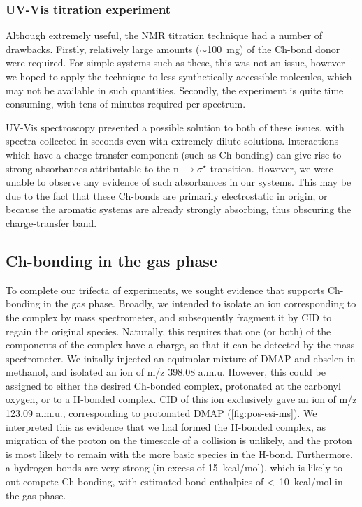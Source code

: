 \subsubsection{UV-Vis titration experiment}
Although extremely useful, the NMR titration technique had a number of drawbacks.
Firstly, relatively large amounts ($\sim$100~mg) of the Ch-bond donor were required.
For simple systems such as these, this was not an issue, however we hoped to apply the technique to less synthetically accessible molecules, which may not be available in such quantities.
Secondly, the experiment is quite time consuming, with tens of minutes required per spectrum.

UV-Vis spectroscopy presented a possible solution to both of these issues, with spectra collected in seconds even with extremely dilute solutions.
Interactions which have a charge-transfer component (such as Ch-bonding) can give rise to strong absorbances attributable to the n $\rightarrow \sigma^{\star}$ transition.\autocite{Blackstock1987}
However, we were unable to observe any evidence of such absorbances in our systems.
This may be due to the fact that these Ch-bonds are primarily electrostatic in origin, or because the aromatic systems are already strongly absorbing, thus obscuring the charge-transfer band.

\subsection{Ch-bonding in the gas phase}
To complete our trifecta of experiments, we sought evidence that supports Ch-bonding in the gas phase.
Broadly, we intended to isolate an ion corresponding to the complex by mass spectrometer, and subsequently fragment it by CID to regain the original species.
Naturally, this requires that one (or both) of the components of the complex have a charge, so that it can be detected by the mass spectrometer.
We initally injected an equimolar mixture of DMAP and ebselen  in methanol, and isolated an ion of m/z 398.08 a.m.u.
However, this could be assigned to either the desired Ch-bonded complex, protonated at the carbonyl oxygen, or to a H-bonded complex.
CID of this ion exclusively gave an ion of m/z 123.09 a.m.u., corresponding to protonated DMAP (\ref{fig:pos-esi-ms}).
We interpreted this as evidence that we had formed the H-bonded complex, as migration of the proton on the timescale of a collision is unlikely, and the proton is most likely to remain with the more basic species in the H-bond.
Furthermore, a  hydrogen bonds are very strong (in excess of 15~kcal/mol)\autocite{Emsley1980}, which is likely to out compete Ch-bonding, with estimated bond enthalpies of <~10~kcal/mol in the gas phase.

